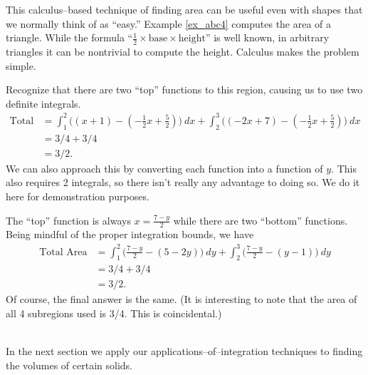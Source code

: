 This calculus--based technique of finding area can be useful even with shapes that we normally think of as ``easy.'' Example \ref{ex_abc4} computes the area of a triangle. While the formula ``$\frac12\times\text{base}\times\text{height}$'' is well known, in arbitrary triangles it can be nontrivial to compute the height. Calculus makes the problem simple.\\


{Recognize that there are two ``top'' functions to this region, causing us to use two definite integrals.
\begin{align*}
\text{Total Area} &= \int_1^2\big((x+1)-(-\frac12x+\frac52)\big)\ dx + \int_2^3\big((-2x+7)-(-\frac12x+\frac52)\big)\ dx \\
						&= 3/4+3/4\\
						&=3/2.
\end{align*}
We can also approach this by converting each function into a function of $y$. This also requires 2 integrals, so there isn't really any advantage to doing so. We do it here for demonstration purposes.

The ``top'' function is always $x=\frac{7-y}2$ while there are two ``bottom'' functions. Being mindful of the proper integration bounds, we have
\begin{align*}
\text{Total Area} &= \int_1^2\big(\frac{7-y}2 - (5-2y)\big)\ dy + \int_2^3\big(\frac{7-y}2-(y-1)\big)\ dy \\
			&= 3/4 + 3/4\\
			&= 3/2.
\end{align*}
Of course, the final answer is the same. (It is interesting to note that the area of all 4 subregions used is 3/4. This is coincidental.)
}\\



In the next section we apply our applications--of--integration techniques to finding the volumes of certain solids.
